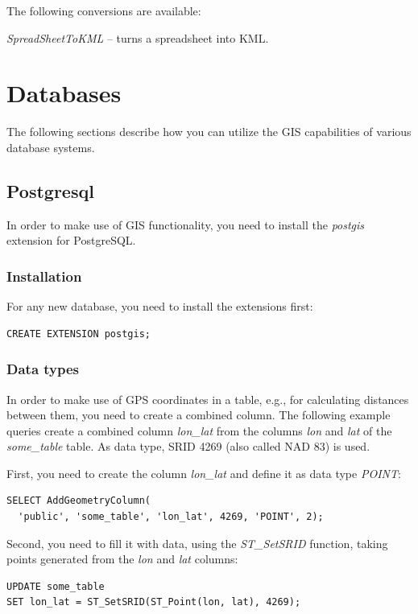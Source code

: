 \documentclass[a4paper]{book}
\begin{document}
\noindent The following conversions are available:
\begin{tight_itemize}
	\item \textit{SpreadSheetToKML} -- turns a spreadsheet into
	KML\cite{kml}.
\end{tight_itemize}


\chapter{Databases}

The following sections describe how you can utilize the GIS capabilities
of various database systems.

\section{Postgresql}
In order to make use of GIS functionality, you need to install the
\textit{postgis} extension\cite{postgis} for PostgreSQL\cite{postgresql}.

\subsection{Installation}
For any new database, you need to install the extensions first:
\begin{verbatim}
CREATE EXTENSION postgis;
\end{verbatim}

\subsection{Data types}
In order to make use of GPS coordinates in a table, e.g., for calculating
distances between them, you need to create a combined column. The following
example queries create a combined column \textit{lon\_lat} from the columns
\textit{lon} and \textit{lat} of the \textit{some\_table} table.
As data type, SRID 4269\cite{srid4269} (also called NAD 83) is used.

\noindent First, you need to create the column \textit{lon\_lat} and
 define it as data type \textit{POINT}:

\begin{verbatim}
SELECT AddGeometryColumn(
  'public', 'some_table', 'lon_lat', 4269, 'POINT', 2);
\end{verbatim}

\noindent Second, you need to fill it with data, using the \textit{ST\_SetSRID}
function, taking points generated from the \textit{lon} and \textit{lat}
columns:
\begin{verbatim}
UPDATE some_table
SET lon_lat = ST_SetSRID(ST_Point(lon, lat), 4269);
\end{verbatim}
\end{document}
